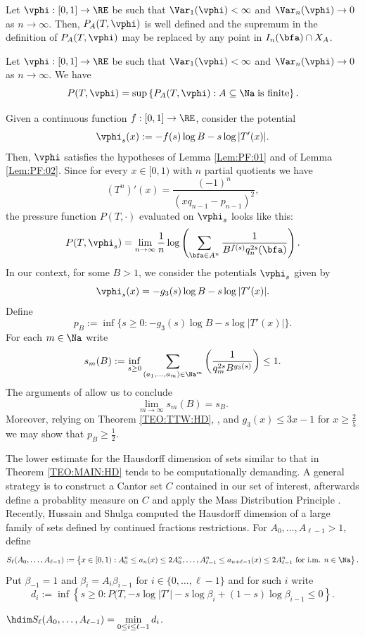 \documentclass[12pt,a4paper]{amsart}
\begin{document}
\begin{lem01}\label{Lem:PF:01}
Let $\vphi:[0,1]\to\RE$ be such that $\Var_1(\vphi)<\infty$ and $\Var_n(\vphi)\to 0$ as $n\to\infty$. Then, $P_{A}(T,\vphi)$ is well defined and the supremum in the definition of $P_{A}(T,\vphi)$ may be replaced by any point in $I_n(\bfa)\cap X_{A}$.
\end{lem01}
\begin{lem01}\label{Lem:PF:02}
Let $\vphi:[0,1]\to\RE$ be such that $\Var_1(\vphi)<\infty$ and $\Var_n(\vphi)\to 0$ as $n\to\infty$. We have
\[
P(T,\vphi)
=
\sup \left\{ P_{A}(T,\vphi): A\subseteq \Na\;\text{\rm is finite}\right\}.
\]
\end{lem01}
Given a continuous function $f:[0,1]\to\RE$, consider the potential
\[
\vphi_s(x)
:= 
-f(s)\log B - s\log|T'(x)|.
\]
Then, $\vphi$ satisfies the hypotheses of Lemma \ref{Lem:PF:01} and of Lemma \ref{Lem:PF:02}. Since for every $x\in [0,1)$ with $n$ partial quotients we have
\[
(T^n)'(x)
=
\frac{(-1)^n}{(xq_{n-1}-p_{n-1})^2},
\]
the pressure function $P(T,\cdot)$ evaluated on $\vphi_s$ looks like this:
\[
P(T,\vphi_s)
=
\lim_{n\to\infty} 
\frac{1}{n} 
\log\left( 
\sum_{\bfa\in A^n} \frac{1}{B^{f(s)} q_{n}^{2s}(\bfa)} 
\right).
\]
In our context, for some $B>1$, we consider the potentials $\vphi_s$ given by 
\[
\vphi_s(x)
=
-g_3(s)\log B -s\log |T'(x)|.
\]
Define
\[
p_B
:=
\inf\{s\geq 0: -g_3(s)\log B -s\log |T'(x)|\}.
\]
For each $m\in\Na$ write
\begin{equation}\label{Eq:DefSmB}
s_m(B)
:=
\inf_{s\geq 0}
\sum_{(a_1,\ldots, a_m)\in\Na^m} 
\left(\frac{1}{q_m^{2s} B^{g_3(s)}}\right) \leq 1.
\end{equation}
The arguments of \cite[Section 2]{WangWu2008} allow us to conclude
\[
\lim_{m\to\infty} s_m(B)
=
s_B.
\]
Moreover, relying on Theorem \ref{TEO:TTW:HD}, \cite[Proposition 2.11]{TanTianWang2023}, and $g_3(x)\leq 3x-1$ for $x\geq \frac{2}{5}$ we may show that $p_B\geq \frac{1}{2}$.


The lower estimate for the Hausdorff dimension of sets similar to that in Theorem \ref{TEO:MAIN:HD} tends to be computationally demanding. A general strategy is to construct a Cantor set $C$ contained in our set of interest, afterwards define a probablity measure on $C$ and apply the Mass Distribution Principle \cite[Proposition 4.2]{FalconerBookFractal}. Recently, Hussain and Shulga \cite{ShulgaHussain2023Exp} computed the Hausdorff dimension of a large family of sets defined by continued fractions restrictions. For $A_0,\ldots, A_{\ell-1}>1$, define  
\[
S_{\ell}(A_0,\ldots, A_{\ell-1})
:=
\left\{ x\in [0,1): A_0^n\leq a_n(x)\leq 2A_0^n, \ldots, A_{\ell-1}^n\leq a_{n+\ell-1} (x)\leq 2A_{\ell-1}^n \text{ for i.m.   } n\in\Na\right\}.
\]
Put $\beta_{-1}=1$ and $\beta_{i}=A_i\beta_{i-1}$ for $i\in \{0,\ldots, \ell-1\}$ and for such $i$ write
\[
d_i
:=
\inf\left\{ s\geq 0: P(T,-s\log|T'| - s\log \beta_i + (1-s)\log\beta_{i-1}\leq 0\right\}.
\]
\begin{lem01}\label{Le:MumtazNikita}
$\hdim S_{\ell}(A_0,\ldots, A_{\ell-1})
=
\displaystyle\min_{0\leq i\leq \ell-1} d_i$.

\end{lem01}
\end{document}
